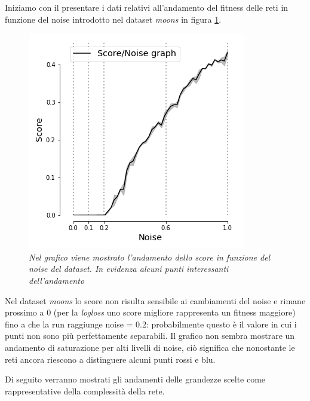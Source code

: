 \documentclass[12pt,a4paper]{report}
\begin{document}
Iniziamo con il presentare i dati relativi all'andamento del fitness delle reti in funzione del noise introdotto nel dataset \textit{moons} in figura \ref{score_moons}.

\begin{figure}[H]
 \centering
 \includegraphics[scale = 0.5]{images/score_noise_moons.png}
 \caption{\textit{Nel grafico viene mostrato l'andamento dello score in funzione del noise del dataset. In evidenza alcuni punti interessanti dell'andamento}}
 \label{score_moons}
\end{figure}

Nel dataset \textit{moons} lo score non risulta sensibile ai cambiamenti del noise e rimane prossimo a 0 (per la \textit{logloss} uno score migliore rappresenta un fitness maggiore) fino a che la run raggiunge noise = 0.2: probabilmente questo è il valore in cui i punti non sono più perfettamente separabili.
Il grafico non sembra mostrare un andamento di saturazione per alti livelli di noise, ciò significa che nonostante le reti ancora riescono a distinguere alcuni punti rossi e blu.

Di seguito verranno mostrati gli andamenti delle grandezze scelte come rappresentative della complessità della rete.
\end{document}
